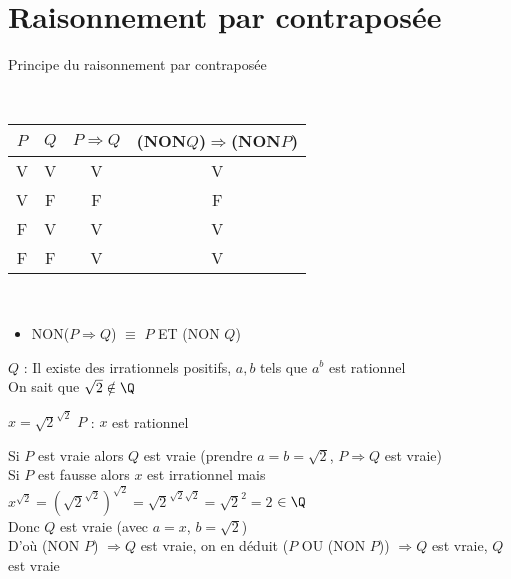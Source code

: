 \documentclass[12pt, a4paper]{report}
\begin{document}
\section{Raisonnement par contraposée}
\begin{definition}{Principe du raisonnement par contraposée}{}
\begin{center}
    \\
\end{center}
\begin{center}
    \begin{tabular}{|c|c|c|c|}
      \hline
      $P$ & $Q$ & $P\Longrightarrow Q$ & (NON$Q$)$\Longrightarrow$(NON$P$) \\
      \hline
      V & V & V & V \\
      \hline
      V & F & F & F\\
      \hline
      F & V & V & V\\
      \hline
      F & F & V & V \\
      \hline
     \end{tabular}
     \\
\end{center}
\begin{itemize}
    \item NON($P\Longrightarrow Q$) $\equiv$ $P$ ET (NON $Q$)
\end{itemize}
\end{definition}

\begin{exemple}{}{}
$Q$ : Il existe des irrationnels positifs, $a,b$ tels que $a^b$ est rationnel\\
On sait que $\sqrt{2} \notin \Q$
\begin{center}
    $x=\sqrt{2}^{\sqrt{2}}$ \: \: \: \: \: $P$ : $x$ est rationnel
\end{center}
Si $P$ est vraie alors $Q$ est vraie (prendre $a=b=\sqrt{2}$, $P \Longrightarrow Q$ est vraie)\\
Si $P$ est fausse alors $x$ est irrationnel mais $x^{\sqrt{2}} = (\sqrt{2}^{\sqrt{2}})^{\sqrt{2}} = \sqrt{2}^{\sqrt{2}\sqrt{2}} = \sqrt{2}^2=2$ $\in \Q$\\
Donc $Q$ est vraie (avec $a=x$, $b=\sqrt{2}$)\\
D'où (NON $P$) $\Longrightarrow Q$ est vraie, on en déduit ($P$ OU (NON $P$)) $\Longrightarrow Q$ est vraie, $Q$ est vraie
\end{exemple}
\end{document}
